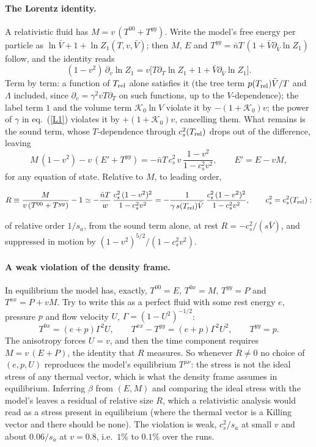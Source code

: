 \documentclass[11pt,aps,preprint,nofootinbib,superscriptaddress,tightenlines]{revtex4-2}
\def\st{\begin{equation}}
\def\stp{\end{equation}}
\def\Eq#1{eq.~(\ref{#1})}
\let\oldparagraph\paragraph
\renewcommand{\paragraph}{\par\bigskip\oldparagraph}
\begin{document}
\paragraph{The Lorentz identity.}  A relativistic fluid has $M=v\,(T^{00}+T^{yy})$.  Write the model's free energy per particle as $\ln\bar V+1+\ln Z_1(T,v,\bar V)$; then $M$, $E$ and
$T^{yy}=\bar nT\,(1+\bar V\partial_{\bar V}\ln Z_1)$ follow, and the identity reads
\st
(1-v^2)\,\partial_v\ln Z_1=v\Big[T\partial_T\ln Z_1+1+\bar V\partial_{\bar V}\ln Z_1\Big] .
\stp
Term by term: a function of $T_{\rm rel}$ alone satisfies it (the tree term $p(T_{\rm rel})\bar V/T$ and $\Lambda$ included, since $\partial_v=\gamma^2vT\partial_T$ on such functions, up to the
$V$-dependence); the label term $1$ and the volume term $\mathcal K_0\ln V$ violate it by $-(1+\mathcal K_0)v$; the power of $\gamma$ in \Eq{L1} violates it by $+(1+\mathcal K_0)v$,
cancelling them.  What remains is the sound term, whose $T$-dependence through $c_s^2(T_{\rm rel})$ drops out of the difference, leaving
\st
M\,(1-v^2)-v\,(E'+T^{yy})=-\bar nT\,c_s^2\,v\,\frac{1-v^2}{1-c_s^2v^2},\qquad E'=E-vM ,
\stp
for any equation of state.  Relative to $M$, to leading order,
\begin{keyeq}
\st
R\equiv\frac{M}{v\,(T^{00}+T^{yy})}-1\simeq-\frac{\bar nT}{w}\,\frac{c_s^2\,(1-v^2)^2}{1-c_s^2v^2}
=-\frac{1}{\gamma\,s(T_{\rm rel})\bar V}\,\frac{c_s^2\,(1-v^2)^2}{1-c_s^2v^2},\qquad c_s^2=c_s^2(T_{\rm rel}) :
\label{Rv}
\stp
\end{keyeq}
of relative order $1/s_a$, from the sound term alone, at rest $R=-c_s^2/(s\bar V)$, and suppressed in motion by $(1-v^2)^{5/2}/(1-c_s^2v^2)$.

\paragraph{A weak violation of the density frame.}  In equilibrium the model has, exactly, $T^{00}=E$, $T^{0x}=M$, $T^{yy}=P$ and $T^{xx}=P+vM$.  Try to write this
as a perfect fluid with some rest energy $e$, pressure $p$ and flow velocity $U$, $\Gamma=(1-U^2)^{-1/2}$:
\st
T^{0x}=(e+p)\Gamma^2U,\qquad T^{xx}-T^{yy}=(e+p)\Gamma^2U^2,\qquad T^{yy}=p .
\stp
The anisotropy forces $U=v$, and then the time component requires $M=v\,(E+P)$, the identity that $R$ measures.  So whenever $R\neq0$ no choice of $(e,p,U)$ reproduces the
model's equilibrium $T^{\mu\nu}$: the stress is not the ideal stress of any thermal vector, which is what the density frame assumes in equilibrium.  Inferring $\beta$ from
$(E,M)$ and comparing the ideal stress with the model's leaves a residual of relative size $R$, which a relativistic analysis would read as a stress present in equilibrium
(where the thermal vector is a Killing vector and there should be none).  The violation is weak, $c_s^2/s_a$ at small $v$ and about $0.06/s_a$ at $v=0.8$, i.e.\ $1\%$ to
$0.1\%$ over the runs.
\end{document}
